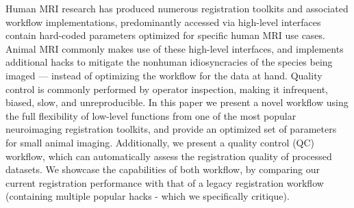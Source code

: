 Human MRI research has produced numerous registration toolkits and associated workflow implementations, predominantly accessed via high-level interfaces contain hard-coded parameters optimized for specific human MRI use cases.
Animal MRI commonly makes use of these high-level interfaces, and implements additional hacks to mitigate the nonhuman idiosyncracies of the species being imaged --- instead of optimizing the workflow for the data at hand.
Quality control is commonly performed by operator inspection, making it infrequent, biased, slow, and unreproducible.
In this paper we present a novel workflow using the full flexibility of low-level functions from one of the most popular neuroimaging registration toolkits, and provide an optimized set of parameters for small animal imaging.
Additionally, we present a quality control (QC) workflow, which can automatically assess the registration quality of processed datasets.
We showcase the capabilities of both workflow, by comparing our current registration performance with that of a legacy registration workflow (containing multiple popular hacks - which we specifically critique).

